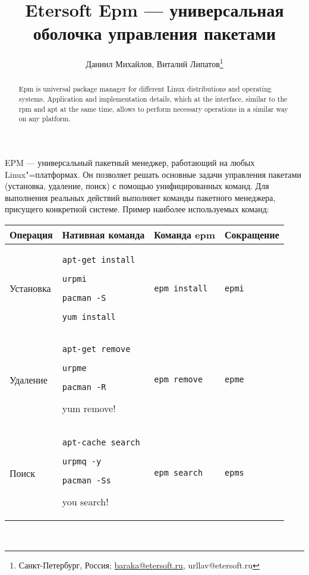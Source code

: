 \documentclass[10pt, a5paper]{article}
\def\vv!#1!{\texttt{#1}}
\begin{document}
\title{Etersoft Epm — универсальная оболочка управления пакетами}%

\author{Даниил Михайлов, Виталий Липатов\footnote{Санкт-Петербург, Россия; \url{baraka@etersoft.ru}, url{lav@etersoft.ru}}}
\maketitle

\begin{abstract}
Epm is universal package manager for different Linux distributions and operating systems. Application and implementation details, which at the interface, similar to the rpm and apt at the same time, allows to perform necessary operations in a similar way on any platform.
\end{abstract}

EPM — универсальный пакетный менеджер, работающий на любых Linux"=платформах. Он позволяет решать основные задачи управления пакетами (установка, удаление, поиск) с помощью унифицированных команд. Для выполнения реальных действий выполняет команды пакетного менеджера, присущего конкретной системе.
Пример наиболее используемых команд:

  \begin{tabular}{l|p{2cm}|l|l}
    \hline
    Операция   & Нативная команда  & Команда epm & Сокращение \\
    \hline
    Установка  & \vv!apt-get install! \par \vv!urpmi! \par \vv!pacman -S! \par \vv!yum install! & \vv!epm install! & \vv!epmi! \\
    Удаление   & \vv!apt-get remove! \par \vv!urpme! \par \vv!pacman -R! \par yum remove! & \vv!epm remove! & \vv!epme! \\
    Поиск      & \vv!apt-cache search! \par \vv!urpmq -y! \par \vv!pacman -Ss! \par you search! & \vv!epm search! & \vv!epms! \\
    \hline
  \end{tabular}\\
\end{document}

